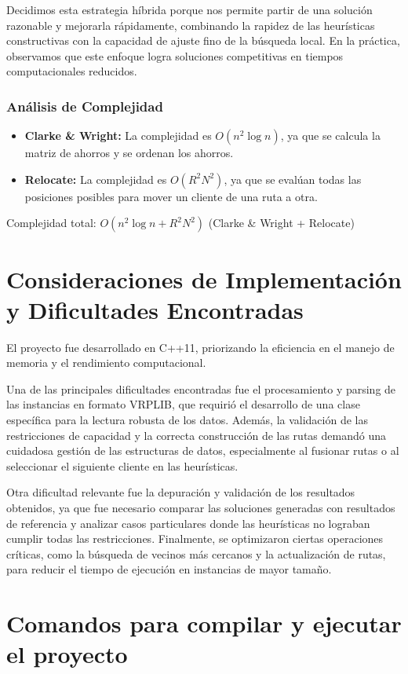 \documentclass[a4paper,12pt]{article}
\begin{document}
Decidimos esta estrategia híbrida porque nos permite partir de una solución razonable y mejorarla rápidamente, combinando la rapidez de las heurísticas constructivas con la capacidad de ajuste fino de la búsqueda local. En la práctica, observamos que este enfoque logra soluciones competitivas en tiempos computacionales reducidos.
\subsubsection{Análisis de Complejidad}
    \begin{itemize}
        \item \textbf{Clarke \& Wright:} La complejidad es $O(n^2 \log n)$, ya que se calcula la matriz de ahorros y se ordenan los ahorros.
        \item \textbf{Relocate:} La complejidad es $O(R^2 N^2)$, ya que se evalúan todas las posiciones posibles para mover un cliente de una ruta a otra.
    \end{itemize}
    Complejidad total: $O(n^2 \log n + R^2 N^2)$ (Clarke \& Wright + Relocate)

\section{Consideraciones de Implementación y Dificultades Encontradas}

El proyecto fue desarrollado en C++11, priorizando la eficiencia en el manejo de memoria y el rendimiento computacional.

Una de las principales dificultades encontradas fue el procesamiento y parsing de las instancias en formato VRPLIB, que requirió el desarrollo de una clase específica para la lectura robusta de los datos. Además, la validación de las restricciones de capacidad y la correcta construcción de las rutas demandó una cuidadosa gestión de las estructuras de datos, especialmente al fusionar rutas o al seleccionar el siguiente cliente en las heurísticas.

Otra dificultad relevante fue la depuración y validación de los resultados obtenidos, ya que fue necesario comparar las soluciones generadas con resultados de referencia y analizar casos particulares donde las heurísticas no lograban cumplir todas las restricciones. Finalmente, se optimizaron ciertas operaciones críticas, como la búsqueda de vecinos más cercanos y la actualización de rutas, para reducir el tiempo de ejecución en instancias de mayor tamaño.
\section{Comandos para compilar y ejecutar el proyecto}
\end{document}
